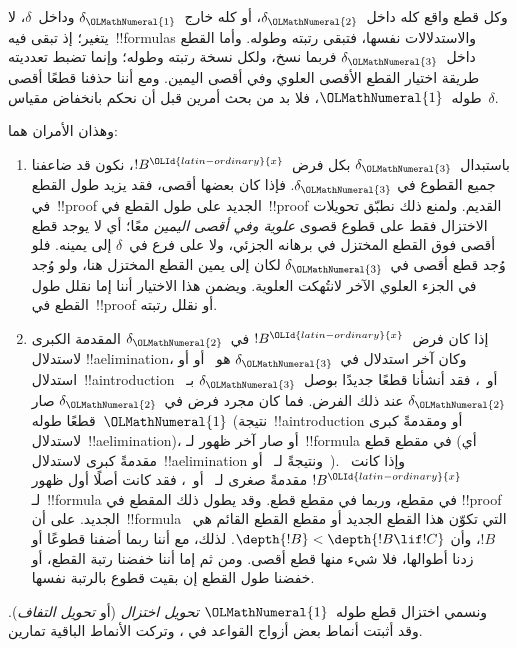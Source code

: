 \documentclass[../../../include/open-logic-section]{subfiles}
\begin{document}
وكل قطع واقع كله داخل~$\delta_\OLMathNumeral{2}$، أو كله خارج~$\delta_\OLMathNumeral{1}$ وداخل~$\delta$،
لا يتغير؛ إذ تبقى فيه~!!{formula}s والاستدلالات نفسها، فتبقى رتبته وطوله.
وأما القطع داخل~$\delta_\OLMathNumeral{3}$ فربما نسخ، ولكل نسخة رتبته وطوله؛ وإنما تضبط
تعدديته طريقة اختيار القطع الأقصى العلوي وفي أقصى اليمين. ومع أننا حذفنا
قطعًا أقصى طوله~$\OLMathNumeral{1}$، فلا بد من بحث أمرين قبل أن نحكم بانخفاض مقياس~$\delta$.

وهذان الأمران هما:
\begin{enumerate}
  \item باستبدال~$\delta_\OLMathNumeral{3}$ بكل فرض~$!B^\OLId{latin-ordinary}{x}$، نكون قد ضاعفنا جميع القطوع في
  $\delta_\OLMathNumeral{3}$. فإذا كان بعضها أقصى، فقد يزيد طول القطع في~!!{proof} الجديد
  على طول القطع في~!!{proof} القديم. ولمنع ذلك نطبّق تحويلات الاختزال فقط
  على قطوع قصوى \emph{علوية وفي أقصى اليمين} معًا؛ أي لا يوجد قطع أقصى فوق
  القطع المختزل في برهانه الجزئي، ولا على فرع في~$\delta$ إلى يمينه. فلو
  وُجد قطع أقصى في~$\delta_\OLMathNumeral{3}$ لكان إلى يمين القطع المختزل هنا، ولو وُجد في
  الجزء العلوي الآخر لانتُهكت العلوية. ويضمن هذا الاختيار أننا إما نقلل طول
  القطع في~!!{proof} أو نقلل رتبته.
  \item إذا كان فرض~$!B^\OLId{latin-ordinary}{x}$ في~$\delta_\OLMathNumeral{2}$ المقدمة الكبرى لاستدلال
  !!a{elimination}، وكان آخر استدلال في~$\delta_\OLMathNumeral{3}$ هو~\Elim{\lor} أو
  \Elim{\lexists} أو استدلال~!!a{introduction} أو~\FalseInt، فقد أنشأنا
  قطعًا جديدًا بوصل~$\delta_\OLMathNumeral{3}$ بـ~$\delta_\OLMathNumeral{2}$ عند ذلك الفرض. فما كان مجرد
  فرض في~$\delta_\OLMathNumeral{2}$ صار قطعًا طوله~$\OLMathNumeral{1}$ (نتيجة~!!a{introduction} أو
  \FalseInt ومقدمةً كبرى لاستدلال~!!a{elimination})، أو صار آخر ظهور
  لـ~!!{formula} في مقطع قطع (أي مقدمةً كبرى لاستدلال~!!a{elimination}
  ونتيجةً لـ~\Elim{\lor} أو~\Elim{\lexists}). وإذا كانت~$!B^\OLId{latin-ordinary}{x}$ مقدمةً
  صغرى لـ~\Elim{\lor} أو~\Elim{\lexists}، فقد كانت أصلًا أول ظهور
  لـ~!!{formula} في مقطع، وربما في مقطع قطع. وقد يطول ذلك المقطع في
  !!{proof} الجديد. على أن~!!{formula} التي تكوّن هذا القطع الجديد أو
  مقطع القطع القائم هي~$!B$، وأن
  $\depth{!B} < \depth{!B \lif !C}$. لذلك، مع أننا ربما أضفنا قطوعًا أو
  زدنا أطوالها، فلا شيء منها قطع أقصى. ومن ثم إما أننا خفضنا رتبة القطع، أو
  خفضنا طول القطع إن بقيت قطوع بالرتبة نفسها.
\end{enumerate}

ونسمي اختزال قطع طوله~$\OLMathNumeral{1}$ \emph{تحويل اختزال} (أو \emph{تحويل
التفاف}). وقد أثبتت أنماط بعض أزواج القواعد في
، وتركت الأنماط الباقية تمارين.
\end{document}
